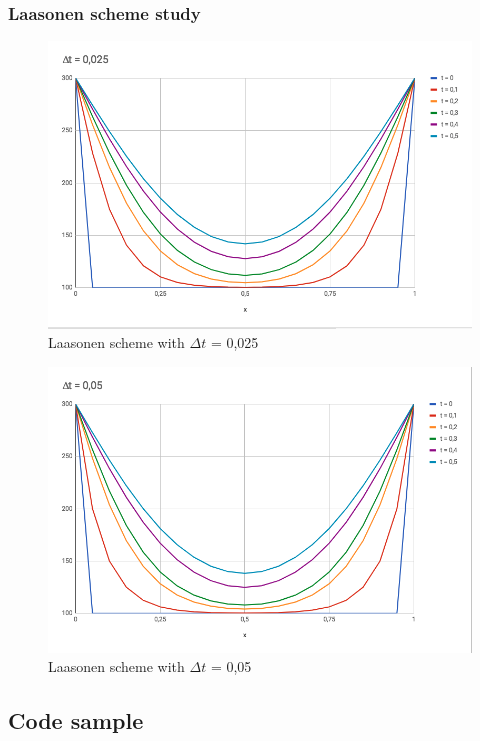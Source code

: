 \documentclass{article}
\begin{document}
            \subsubsection{Laasonen scheme study}
                \begin{figure}[H]
                    \includegraphics[width=\textwidth]{las-2.png}
                    \caption{Laasonen scheme with $\Delta t$ = 0,025}
                \end{figure}
                \begin{figure}[H]
                    \includegraphics[width=\textwidth]{las-3.png}
                    \caption{Laasonen scheme with $\Delta t$ = 0,05}
                \end{figure}
        \subsection{Code sample}
    
\end{document}
